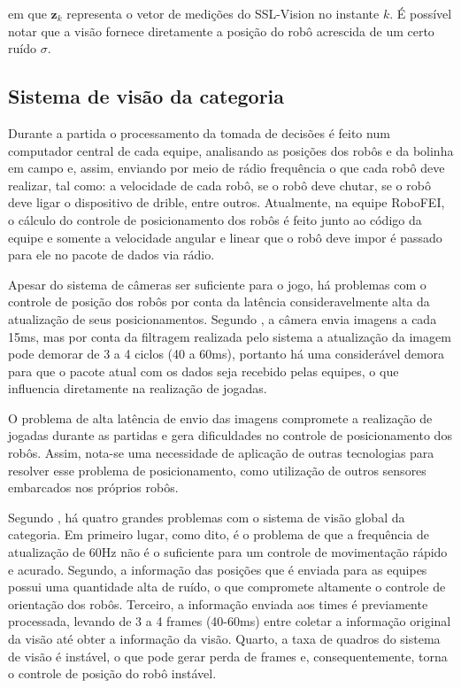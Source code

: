 \documentclass[acronym, symbols, table, deposito]{fei}
\begin{document}
		em que $\textbf{z}_{k}$ representa o vetor de medições do SSL-Vision no instante $k$. É possível notar que a visão fornece diretamente a posição do robô acrescida de um certo ruído $\sigma$.
		
		\subsection{Sistema de visão da categoria }
		
			Durante a partida o processamento da tomada de decisões é feito num computador central de cada equipe, analisando as posições dos robôs e da bolinha em campo e, assim, enviando por meio de rádio frequência o que cada robô deve realizar, tal como: a velocidade de cada robô, se o robô deve chutar, se o robô deve ligar o dispositivo de drible, entre outros. Atualmente, na equipe RoboFEI, o cálculo do controle de posicionamento dos robôs é feito junto ao código da equipe e somente a velocidade angular e linear que o robô deve impor é passado para ele no pacote de dados via rádio.
		
			Apesar do sistema de câmeras ser suficiente para o jogo, há problemas com o controle de posição dos robôs por conta da latência consideravelmente alta da atualização de seus posicionamentos. Segundo \textcite{tdpZJUNlict2020}, a câmera envia imagens a cada 15ms, mas por conta da filtragem realizada pelo sistema a atualização da imagem pode demorar de 3 a 4 ciclos (40 a 60ms), portanto há uma considerável demora para que o pacote atual com os dados seja recebido pelas equipes, o que influencia diretamente na realização de jogadas.
			
			O problema de alta latência de envio das imagens compromete a realização de jogadas durante as partidas e gera dificuldades no controle de posicionamento dos robôs. Assim, nota-se uma necessidade de aplicação de outras tecnologias para resolver esse problema de posicionamento, como utilização de outros sensores embarcados nos próprios robôs.
			
			Segundo \textcite{tdpZJUNlict2020}, há quatro grandes problemas com o sistema de visão global da categoria. Em primeiro lugar, como dito, é o problema de que a frequência de atualização de 60Hz não é o suficiente para um controle de movimentação rápido e acurado. Segundo, a informação das posições que é enviada para as equipes possui uma quantidade alta de ruído, o que compromete altamente o controle de orientação dos robôs. Terceiro, a informação enviada aos times é previamente processada, levando de 3 a 4 frames (40-60ms) entre coletar a informação original da visão até obter a informação da visão. Quarto, a taxa de quadros do sistema de visão é instável, o que pode gerar perda de frames e, consequentemente, torna o controle de posição do robô instável.
			
\end{document}

